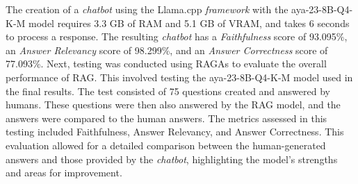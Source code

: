 The creation of a \emph{chatbot} using the Llama.cpp \emph{framework} with the aya-23-8B-Q4-K-M model requires 3.3 GB of RAM and 5.1 GB of VRAM, and takes 6 seconds to process a response. The resulting \emph{chatbot} has a \emph{Faithfulness} score of 93.095\%, an \emph{Answer Relevancy} score of 98.299\%, and an \emph{Answer Correctness} score of 77.093\%. Next, testing was conducted using RAGAs to evaluate the overall performance of RAG. This involved testing the aya-23-8B-Q4-K-M model used in the final results. The test consisted of 75 questions created and answered by humans. These questions were then also answered by the RAG model, and the answers were compared to the human answers. The metrics assessed in this testing included Faithfulness, Answer Relevancy, and Answer Correctness. This evaluation allowed for a detailed comparison between the human-generated answers and those provided by the \emph{chatbot}, highlighting the model's strengths and areas for improvement. 
